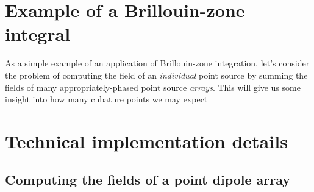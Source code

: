 \documentclass[letterpaper]{article}
\begin{document}
\newpage
\section{Example of a Brillouin-zone integral}

As a simple example of an application of Brillouin-zone integration,
let's consider the problem of computing the field of an
\textit{individual} point source by summing the fields of
many appropriately-phased point source \textit{arrays}.
This will give us some insight into how many cubature points we 
may expect

\newpage
\section{Technical implementation details}

\subsection*{Computing the fields of a point dipole array}

\end{document}
